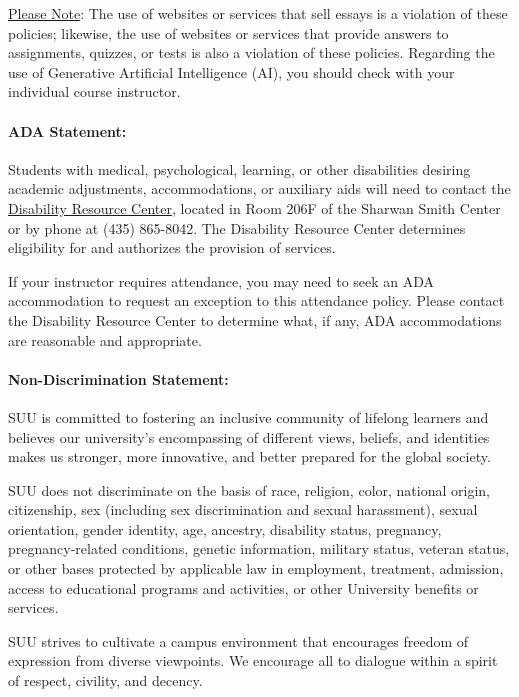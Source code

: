 \documentclass[12pt, letterpaper]{article}
\begin{document}
\noindent
\underline{Please Note}: The use of websites or services that sell essays is a violation of these policies; likewise, the use of websites or services that provide answers to assignments, quizzes, or tests is also a violation of these policies. Regarding the use of Generative Artificial Intelligence (AI), you should check with your individual course instructor.

\paragraph{ADA Statement:}
Students with medical, psychological, learning, or other disabilities desiring academic adjustments, accommodations, or auxiliary aids will need to contact the \href{https://www.suu.edu/disabilityservices/}{Disability Resource Center}, located in Room 206F of the Sharwan Smith Center or by phone at (435) 865-8042. The Disability Resource Center determines eligibility for and authorizes the provision of services.

\noindent
If your instructor requires attendance, you may need to seek an ADA accommodation to request an exception to this attendance policy. Please contact the Disability Resource Center to determine what, if any, ADA accommodations are reasonable and appropriate.

\paragraph{Non-Discrimination Statement:}
SUU is committed to fostering an inclusive community of lifelong learners and believes our university's encompassing of different views, beliefs, and identities makes us stronger, more innovative, and better prepared for the global society. 

\noindent
SUU does not discriminate on the basis of race, religion, color, national origin, citizenship, sex (including sex discrimination and sexual harassment), sexual orientation, gender identity, age, ancestry, disability status, pregnancy, pregnancy-related conditions, genetic information, military status, veteran status, or other bases protected by applicable law in employment, treatment, admission, access to educational programs and activities, or other University benefits or services.

\noindent
SUU strives to cultivate a campus environment that encourages freedom of expression from diverse viewpoints. We encourage all to dialogue within a spirit of respect, civility, and decency. 
\end{document}
